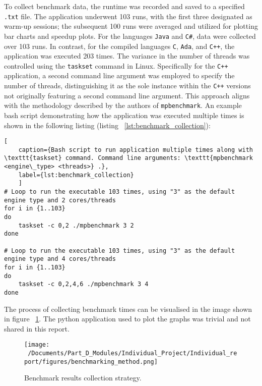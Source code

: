 To collect benchmark data, the runtime was recorded and saved to a specified \texttt{.txt} file. The application underwent 103 runs, with the first three designated as warm-up sessions; the subsequent 100 runs were averaged and utilized for plotting bar charts and speedup plots. For the languages \texttt{Java} and \texttt{C\#}, data were collected over 103 runs. In contrast, for the compiled languages \texttt{C}, \texttt{Ada}, and \texttt{C++}, the application was executed 203 times. The variance in the number of threads was controlled using the \texttt{taskset} command in Linux. Specifically for the \texttt{C++} application, a second command line argument was employed to specify the number of threads, distinguishing it as the sole instance within the \texttt{C++} versions not originally featuring a second command line argument. This approach aligns with the methodology described by the authors of \texttt{mpbenchmark}\cite{mpbenchmark_paper}. An example bash script demonstrating how the application was executed multiple times is shown in the following listing (listing ~\ref{lst:benchmark_collection}):

\begin{lstlisting}[
	caption={Bash script to run application multiple times along with \texttt{taskset} command. Command line arguments: \texttt{mpbenchmark <engine\_type> <threads>} .},
	label={lst:benchmark_collection}
	]
# Loop to run the executable 103 times, using "3" as the default engine type and 2 cores/threads 
for i in {1..103}
do
	taskset -c 0,2 ./mpbenchmark 3 2 
done

# Loop to run the executable 103 times, using "3" as the default engine type and 4 cores/threads 
for i in {1..103}
do
	taskset -c 0,2,4,6 ./mpbenchmark 3 4 
done
\end{lstlisting}

The process of collecting benchmark times can be visualised in the image shown in figure ~\ref{fig:results_collection}. The python application used to plot the graphs was trivial and not shared in this report. 

\begin{figure}[htbp] %
	\centering
	\texttt{[image: ~/Documents/Part\_D\_Modules/Individual\_Project/Individual\_report/figures/benchmarking\_method.png]} %
	\caption{Benchmark results collection strategy.}
	\label{fig:results_collection} %
\end{figure}

